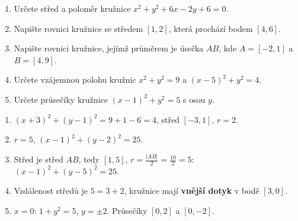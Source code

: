 \begin{problem}
  \begin{enumerate}[label=(\alph*)]
    \item Určete střed a poloměr kružnice $x^2 + y^2 + 6x - 2y + 6 = 0$.
    \item Napište rovnici kružnice se středem $[1, 2]$, která prochází bodem $[4, 6]$.
    \item Napište rovnici kružnice, jejímž průměrem je úsečka $AB$, kde $A = [-2, 1]$ a $B = [4, 9]$.
    \item Určete vzájemnou polohu kružnic $x^2 + y^2 = 9$ a ${(x - 5)}^2 + y^2 = 4$.
    \item Určete průsečíky kružnice ${(x - 1)}^2 + y^2 = 5$ s osou $y$.
  \end{enumerate}
\end{problem}

\begin{solution}
  \begin{enumerate}[label=(\alph*)]
    \item ${(x + 3)}^2 + {(y - 1)}^2 = 9 + 1 - 6 = 4$, střed $[-3, 1]$, $r = 2$.
    \item $r = 5$, ${(x - 1)}^2 + {(y - 2)}^2 = 25$.
    \item Střed je střed $AB$, tedy $[1, 5]$, $r = \frac{|AB|}{2} = \frac{10}{2} = 5$: ${(x - 1)}^2 + {(y - 5)}^2 = 25$.
    \item Vzdálenost středů je $5 = 3 + 2$, kružnice mají \textbf{vnější dotyk} v bodě $[3, 0]$.
    \begin{center}
    \end{center}
    \item $x = 0$: $1 + y^2 = 5$, $y = \pm 2$. Průsečíky $[0, 2]$ a $[0, -2]$.
  \end{enumerate}
\end{solution}

